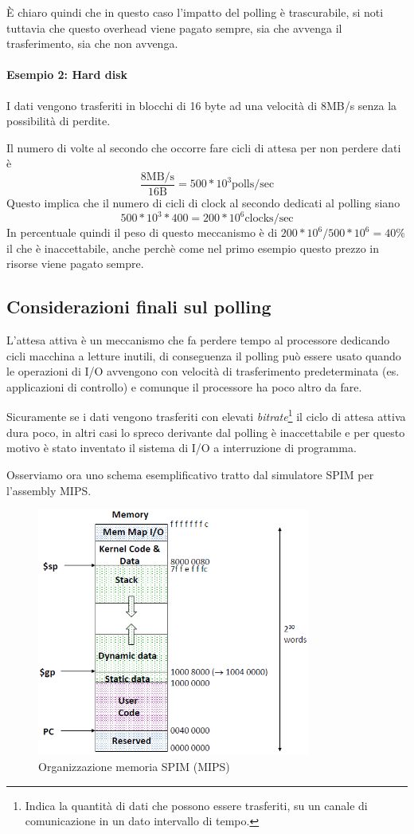 \documentclass[class=book, crop=false, oneside]{standalone}
\begin{document}
È chiaro quindi che in questo caso l'impatto del polling è trascurabile, si noti tuttavia che questo overhead viene pagato sempre, sia che avvenga il trasferimento, sia che non avvenga.

\paragraph{Esempio 2: Hard disk} I dati vengono trasferiti in blocchi di 16 byte ad una velocità di 8MB/s senza la possibilità di perdite.

Il numero di volte al secondo che occorre fare cicli di attesa per non perdere dati è \[\frac{8\textrm{MB/s}}{16\textrm{B}} = 500*10^{3} \textrm{polls/sec}\]
Questo implica che il numero di cicli di clock al secondo dedicati al polling siano \[ 500*10^{3}*400 = 200*10^{6} \textrm{clocks/sec}\]
In percentuale quindi il peso di questo meccanismo è di \(200*10^{6}/500*10^{6}=40\%\) il che è inaccettabile, anche perchè come nel primo esempio questo prezzo in risorse viene pagato sempre.

\subsection{Considerazioni finali sul polling}
L’attesa attiva è un meccanismo che fa perdere tempo al processore dedicando cicli macchina a letture inutili, di conseguenza il polling può essere usato quando le operazioni di I/O avvengono con velocità di trasferimento predeterminata (es. applicazioni di controllo) e comunque il processore ha poco altro da fare.

Sicuramente se i dati vengono trasferiti con elevati \emph{bitrate}\footnote{Indica la quantità di dati che possono essere trasferiti, su un canale di comunicazione in un dato intervallo di tempo.} il ciclo di attesa attiva dura poco, in altri casi lo spreco derivante dal polling è inaccettabile e per questo motivo è stato inventato il sistema di I/O a interruzione di programma.

Osserviamo ora uno schema esemplificativo tratto dal simulatore SPIM per l'assembly MIPS.
\begin{figure}
	\centering
	\includegraphics[width=0.8\textwidth,keepaspectratio]{SPIM}
	\caption{Organizzazione memoria SPIM (MIPS)}
\end{figure}
\end{document}
